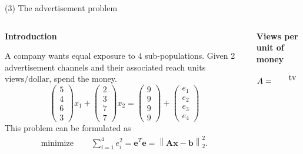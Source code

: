 \documentclass[11pt, aspectratio=149]{beamer}
\theoremstyle{plain}
\newcommand{\norm}[1]{\left\lVert#1\right\rVert}
\begin{document}

\begin{frame}[fragile, t]{(3) The advertisement problem}
	\begin{columns}
		\begin{column}{0.6\textwidth}
			\textbf{Introduction}\\ \vspace*{0.5em} 
			
			A company wants equal exposure to 4 sub-populations.
			Given 2 advertisement channels and their associated reach units $\text{views} / \text{dollar}$, spend the money.
			\begin{equation*}
				\begin{pmatrix}
				5\\ 
				4\\ 
				6\\ 
				3
				\end{pmatrix}
				x_1
				+
				\begin{pmatrix}
				2\\ 
				3\\ 
				7\\ 
				7
				\end{pmatrix}
				x_2
				=
				\begin{pmatrix}
				9 \\ 
				9\\ 
				9\\ 
				9
				\end{pmatrix}
				+
				\begin{pmatrix}
				e_1 \\ 
				e_2\\ 
				e_3\\ 
				e_4
				\end{pmatrix}
			\end{equation*}
			This problem can be formulated as
			\begin{align*}
			\text{minimize } \quad & \sum_{i=1}^{4} e_i^2 
			=  	\mathbf{e}^T \mathbf{e}	= \norm{ \mathbf{A} \mathbf{x} - \mathbf{b} }_2^2.
			\end{align*}
		\end{column}
		\begin{column}{0.4\textwidth}%
			\begin{center}
				\textbf{Views per unit of money}
			\end{center}
			\[
			A = 
			\begin{blockarray}{rcc}
			& \text{tv} & \text{paper}  \\

\end{blockarray}\]
\end{column}
\end{columns}
\end{frame}
\end{document}
